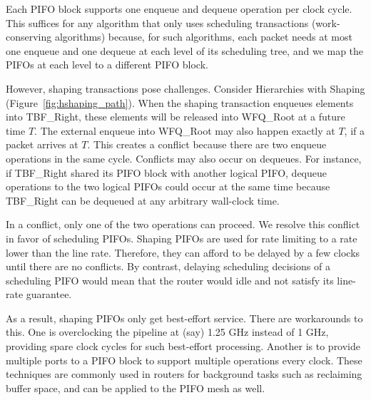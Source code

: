 Each PIFO block supports one enqueue and dequeue operation per clock cycle.
This suffices for any algorithm that only uses scheduling transactions
(work-conserving algorithms) because, for such algorithms, each packet needs at
most one enqueue and one dequeue at each level of its scheduling tree, and we
map the PIFOs at each level to a different PIFO block.

However, shaping transactions pose challenges. Consider Hierarchies with
Shaping (Figure~\ref{fig:hshaping_path}). When the shaping transaction enqueues
elements into TBF\_Right, these elements will be released into WFQ\_Root at a
future time $T$. The external enqueue into WFQ\_Root may also happen exactly at
$T$, if a packet arrives at $T$. This creates a conflict because there are two
enqueue operations in the same cycle.  Conflicts may also occur on dequeues.
For instance, if TBF\_Right shared its PIFO block with another logical PIFO,
dequeue operations to the two logical PIFOs could occur at the same time
because TBF\_Right can be dequeued at any arbitrary wall-clock time.


In a conflict, only one of the two operations can proceed. We resolve
this conflict in favor of scheduling PIFOs. Shaping PIFOs are used for
rate limiting to a rate lower than the line rate. Therefore, they
can afford to be delayed by a few clocks until there are no
conflicts. By contrast, delaying scheduling decisions of a scheduling PIFO
would mean that the router would idle and not satisfy its line-rate guarantee.


As a result, shaping PIFOs only get best-effort
service. There are workarounds to this. One is overclocking the pipeline at
(say) 1.25 GHz instead of 1 GHz, providing spare clock cycles for such
best-effort processing. Another is to provide multiple ports to a PIFO block to
support multiple operations every clock.  These techniques are commonly used in
routers for background tasks such as reclaiming buffer
space, and can be applied to the PIFO mesh as well.
